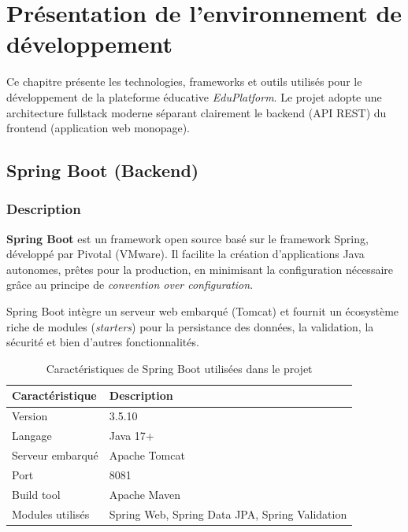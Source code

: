 \chapter{Présentation de l'environnement de développement}

Ce chapitre présente les technologies, frameworks et outils utilisés pour le développement de la plateforme éducative \textit{EduPlatform}. Le projet adopte une architecture fullstack moderne séparant clairement le backend (API REST) du frontend (application web monopage).

\section{Spring Boot (Backend)}

\subsection{Description}

\textbf{Spring Boot} est un framework open source basé sur le framework Spring, développé par Pivotal (VMware). Il facilite la création d'applications Java autonomes, prêtes pour la production, en minimisant la configuration nécessaire grâce au principe de \textit{convention over configuration}.

\vspace{0.3cm}

Spring Boot intègre un serveur web embarqué (Tomcat) et fournit un écosystème riche de modules (\textit{starters}) pour la persistance des données, la validation, la sécurité et bien d'autres fonctionnalités.

\vspace{0.3cm}

\begin{table}[H]
\centering
\caption{Caractéristiques de Spring Boot utilisées dans le projet}
\label{tab:springboot}
\begin{tabularx}{\textwidth}{lX}
\toprule
\textbf{Caractéristique} & \textbf{Description} \\
\midrule
Version & 3.5.10 \\
Langage & Java 17+ \\
Serveur embarqué & Apache Tomcat \\
Port & 8081 \\
Build tool & Apache Maven \\
Modules utilisés & Spring Web, Spring Data JPA, Spring Validation \\
\bottomrule
\end{tabularx}
\end{table}

